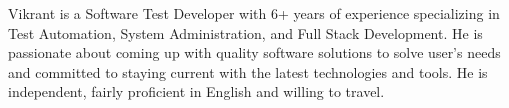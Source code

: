 

\begin{cvparagraph}

Vikrant is a Software Test Developer with 6+ years of experience specializing in Test Automation, System Administration, and Full Stack Development. He is passionate about coming up with quality software solutions to solve user's needs and committed to staying current with the latest technologies and tools. He is independent, fairly proficient in English and willing to travel.
\end{cvparagraph}
